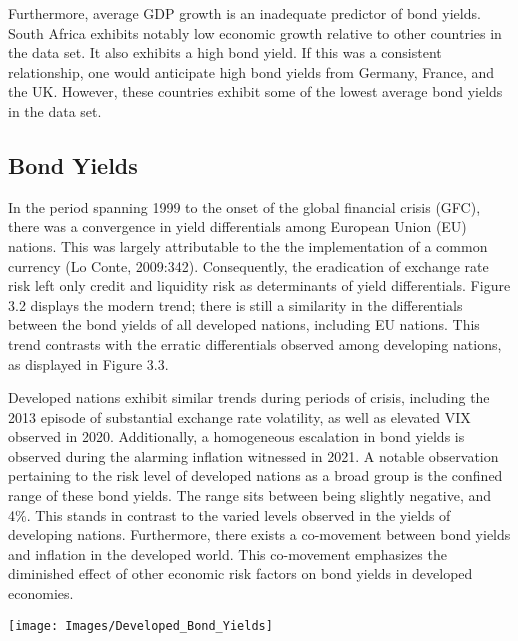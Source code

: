 \documentclass[11pt,preprint, authoryear]{elsarticle}
\let\origfigure\figure
\let\endorigfigure\endfigure
\renewenvironment{figure}[1][2] {
    \expandafter\origfigure\expandafter[H]
} {
    \endorigfigure
}
\numberwithin{equation}{section}
\numberwithin{figure}{section}
\numberwithin{table}{section}
\begin{document}
Furthermore, average GDP growth is an inadequate predictor of bond
yields. South Africa exhibits notably low economic growth relative to
other countries in the data set. It also exhibits a high bond yield. If
this was a consistent relationship, one would anticipate high bond
yields from Germany, France, and the UK. However, these countries
exhibit some of the lowest average bond yields in the data set.

\hypertarget{bond-yields}{%
\subsection{Bond Yields}\label{bond-yields}}

In the period spanning 1999 to the onset of the global financial crisis
(GFC), there was a convergence in yield differentials among European
Union (EU) nations. This was largely attributable to the the
implementation of a common currency (Lo Conte, 2009:342). Consequently,
the eradication of exchange rate risk left only credit and liquidity
risk as determinants of yield differentials. Figure 3.2 displays the
modern trend; there is still a similarity in the differentials between
the bond yields of all developed nations, including EU nations. This
trend contrasts with the erratic differentials observed among developing
nations, as displayed in Figure 3.3.

Developed nations exhibit similar trends during periods of crisis,
including the 2013 episode of substantial exchange rate volatility, as
well as elevated VIX observed in 2020. Additionally, a homogeneous
escalation in bond yields is observed during the alarming inflation
witnessed in 2021. A notable observation pertaining to the risk level of
developed nations as a broad group is the confined range of these bond
yields. The range sits between being slightly negative, and 4\%. This
stands in contrast to the varied levels observed in the yields of
developing nations. Furthermore, there exists a co-movement between bond
yields and inflation in the developed world. This co-movement emphasizes
the diminished effect of other economic risk factors on bond yields in
developed economies.

\begin{figure}

{\centering \texttt{[image: Images/Developed\_Bond\_Yields]} 

}

\caption{Bond Yields of Developed Nations \label{Figure3.2}}\label{fig:unnamed-chunk-3}
\end{figure}
\end{document}
